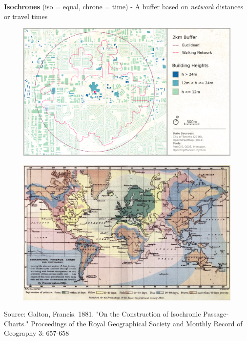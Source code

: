 \documentclass[aspectratio=169]{beamer}
\begin{document}
\begin{frame}
	
	\textbf{Isochrones} (iso = equal, chrone = time) - A buffer based on \textit{network} distances or travel times
	
	
	\begin{figure}
		\centering
		\includegraphics[width=0.8\linewidth]{images/STC_buffers}
	\end{figure}
	
	
\end{frame}



\begin{frame}
	
	
	\begin{figure}
		\centering
		\includegraphics[width=0.8\linewidth]{images/Isochronic_Galton_1881}
	\end{figure}
	\tiny	Source:  Galton,   Francis.   1881.   "On   the   Construction   of   Isochronic   Passage-Charts." Proceedings  of  the  Royal  Geographical  Society  and Monthly Record of Geography 3: 657-658
\end{frame}
\end{document}

